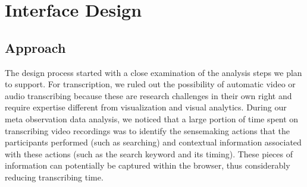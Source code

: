 \section{Interface Design}
\label{sec:sp-design}

\subsection{Approach}
The design process started with a close examination of the analysis steps we plan to support. For transcription, we ruled out the possibility of automatic video or audio transcribing because these are research challenges in their own right and require expertise different from visualization and visual analytics. During our meta observation data analysis, we noticed that a large portion of time spent on transcribing video recordings was to identify the sensemaking actions that the participants performed (such as searching) and contextual information associated with these actions (such as the search keyword and its timing). These pieces of information can potentially be captured within the browser, thus considerably reducing transcribing time.

